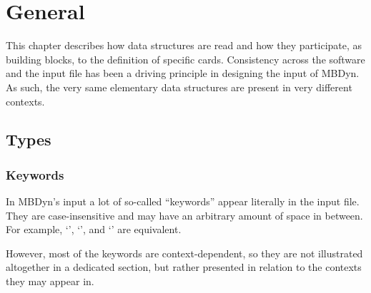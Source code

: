 %
%
%
%
%
% 
%
%

\chapter{General}\label{sec:GENERAL}
This chapter describes how data structures are read 
and how they participate, as building blocks, to the definition
of specific cards.
Consistency across the software and the input file has been 
a driving principle in designing the input of MBDyn.
As such, the very same elementary data structures are present
in very different contexts.



\section{Types}



\subsection{Keywords}
In MBDyn's input a lot of so-called ``keywords'' appear literally
in the input file.
They are case-insensitive and may have an arbitrary amount of space
in between.
For example, `', `',
and `' are equivalent.

However, most of the keywords are context-dependent,
so they are not illustrated altogether in a dedicated section,
but rather presented in relation to the contexts they may appear in.




